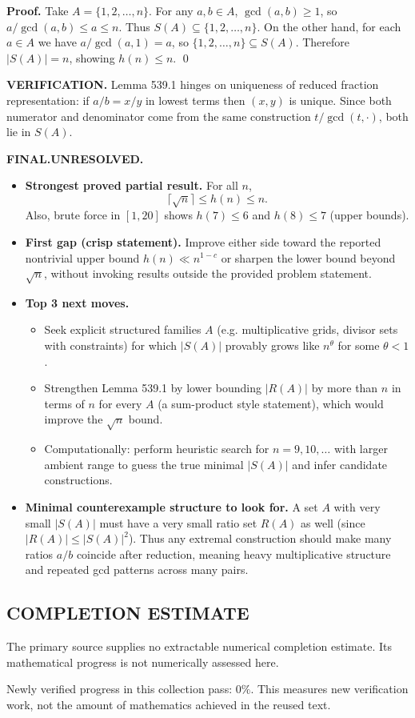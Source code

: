 \textbf{Proof.}
Take $A=\{1,2,\dots,n\}$. For any $a,b\in A$, $\gcd(a,b)\ge 1$, so
\(
 a/\gcd(a,b)\le a\le n.
\)
Thus $S(A)\subseteq\{1,2,\dots,n\}$.
On the other hand, for each $a\in A$ we have $a/\gcd(a,1)=a$, so $\{1,2,\dots,n\}\subseteq S(A)$.
Therefore $|S(A)|=n$, showing $h(n)\le n$. \qed

\noindent\textbf{VERIFICATION.}
Lemma 539.1 hinges on uniqueness of reduced fraction representation: if $a/b=x/y$ in lowest terms then $(x,y)$ is unique. Since both numerator and denominator come from the same construction $t/\gcd(t,\cdot)$, both lie in $S(A)$.

\noindent\textbf{FINAL.}\;\textbf{UNRESOLVED.}
\begin{itemize}
\item[(i)] \textbf{Strongest proved partial result.} For all $n$,
\[\lceil\sqrt n\rceil\le h(n)\le n.\]
Also, brute force in $[1,20]$ shows $h(7)\le 6$ and $h(8)\le 7$ (upper bounds).
\item[(ii)] \textbf{First gap (crisp statement).} Improve either side toward the reported nontrivial upper bound $h(n)\ll n^{1-c}$ or sharpen the lower bound beyond $\sqrt n$, without invoking results outside the provided problem statement.
\item[(iii)] \textbf{Top 3 next moves.}
  \begin{itemize}
  \item Seek explicit structured families $A$ (e.g. multiplicative grids, divisor sets with constraints) for which $|S(A)|$ provably grows like $n^\theta$ for some $\theta<1$.
  \item Strengthen Lemma 539.1 by lower bounding $|R(A)|$ by more than $n$ in terms of $n$ for every $A$ (a sum-product style statement), which would improve the $\sqrt n$ bound.
  \item Computationally: perform heuristic search for $n=9,10,\dots$ with larger ambient range to guess the true minimal $|S(A)|$ and infer candidate constructions.
  \end{itemize}
\item[(iv)] \textbf{Minimal counterexample structure to look for.} A set $A$ with very small $|S(A)|$ must have a very small ratio set $R(A)$ as well (since $|R(A)|\le |S(A)|^2$). Thus any extremal construction should make many ratios $a/b$ coincide after reduction, meaning heavy multiplicative structure and repeated gcd patterns across many pairs.
\end{itemize}




\subsection*{COMPLETION ESTIMATE}
The primary source supplies no extractable numerical completion estimate. Its mathematical progress is not numerically assessed here.

Newly verified progress in this collection pass: $0\%$. This measures new verification work, not the amount of mathematics achieved in the reused text.
